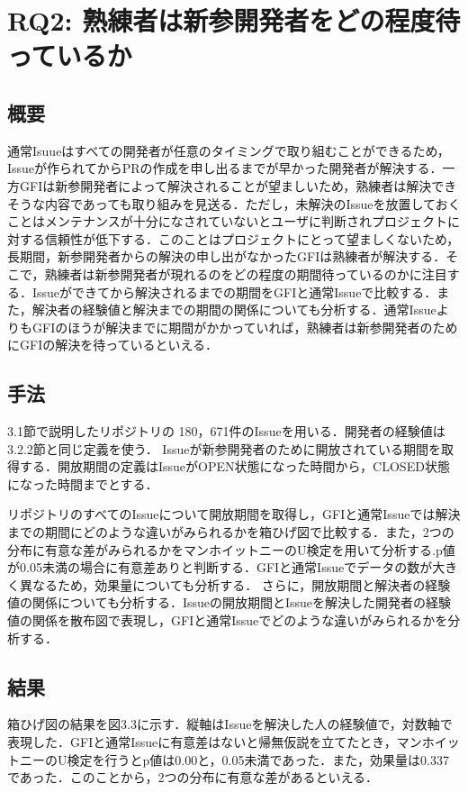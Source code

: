 \documentclass[11pt]{jreport}
\newcommand{\RQTwo}{熟練者は新参開発者をどの程度待っているか}
\newcommand{\NIssue}{180，671}
\begin{document}
\section{RQ2: \RQTwo}

\subsection{概要}

通常Isuueはすべての開発者が任意のタイミングで取り組むことができるため，Issueが作られてからPRの作成を申し出るまでが早かった開発者が解決する．一方GFIは新参開発者によって解決されることが望ましいため，熟練者は解決できそうな内容であっても取り組みを見送る．ただし，未解決のIssueを放置しておくことはメンテナンスが十分になされていないとユーザに判断されプロジェクトに対する信頼性が低下する．このことはプロジェクトにとって望ましくないため，長期間，新参開発者からの解決の申し出がなかったGFIは熟練者が解決する．そこで，熟練者は新参開発者が現れるのをどの程度の期間待っているのかに注目する．Issueができてから解決されるまでの期間をGFIと通常Issueで比較する．また，解決者の経験値と解決までの期間の関係についても分析する．通常IssueよりもGFIのほうが解決までに期間がかかっていれば，熟練者は新参開発者のためにGFIの解決を待っているといえる．

\subsection{手法}
3.1節で説明したリポジトリの \NIssue 件のIssueを用いる．開発者の経験値は3.2.2節と同じ定義を使う．
Issueが新参開発者のために開放されている期間を取得する．開放期間の定義はIssueがOPEN状態になった時間から，CLOSED状態になった時間までとする．

リポジトリのすべてのIssueについて開放期間を取得し，GFIと通常Issueでは解決までの期間にどのような違いがみられるかを箱ひげ図で比較する．また，2つの分布に有意な差がみられるかをマンホイットニーのU検定を用いて分析する.p値が0.05未満の場合に有意差ありと判断する．GFIと通常Issueでデータの数が大きく異なるため，効果量についても分析する．
さらに，開放期間と解決者の経験値の関係についても分析する．Issueの開放期間とIssueを解決した開発者の経験値の関係を散布図で表現し，GFIと通常Issueでどのような違いがみられるかを分析する．

\subsection{結果}
箱ひげ図の結果を図3.3に示す．縦軸はIssueを解決した人の経験値で，対数軸で表現した．GFIと通常Issueに有意差はないと帰無仮説を立てたとき，マンホイットニーのU検定を行うとp値は0.00と，0.05未満であった．また，効果量は0.337であった．このことから，2つの分布に有意な差があるといえる．
\end{document}
